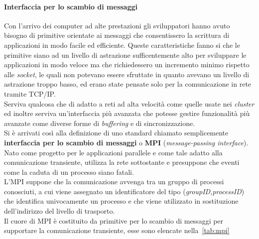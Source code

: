 \paragraph{Interfaccia per lo scambio di messaggi}
Con l'arrivo dei computer ad alte prestazioni gli sviluppatori hanno avuto bisogno di primitive orientate ai messaggi  che consentissero la scrittura di applicazioni in modo facile ed efficiente. Queste caratteristiche fanno si che le primitive siano ad un livello di astrazione sufficentemente alto per sviluppare le applicazioni in modo veloce ma che richiedessero un incremento minimo rispetto alle \emph{socket}, le quali non potevano essere sfruttate in quanto avevano un livello di astrazione troppo basso, ed erano state pensate solo per la comunicazione in rete tramite TCP/IP.\\
Serviva qualcosa che di adatto a reti ad alta velocità come quelle usate nei \emph{cluster} ed inoltre serviva un'interfaccia più avanzata che potesse gestire funzionalità più avanzate come diverse forme di \emph{buffering} e di sincronizzazione.\\
Si è arrivati così alla definizione di uno standard chiamato semplicemente \textbf{interfaccia per lo scambio di messaggi} o \textbf{MPI} (\emph{message-passing interface}). Nato come progetto per le applicazioni parallele e come tale adatto alla comunicazione transiente, utilizza la rete sottostante e presuppone che eventi come la caduta di un processo siano fatali.\\
L'MPI suppone che la comunicazione avvenga tra un gruppo di processi conosciuti, a cui viene assegnato un identificatore  del tipo (\emph{groupID,processID}) che identifica univocamente un processo e che viene utilizzato in sostituzione dell'indirizzo del livello di trasporto.\\
Il cuore di MPI è costituito da primitive per lo scambio di messaggi per supportare la comunicazione transiente, esse sono elencate nella \tablename\,\ref{tab:mpi}
